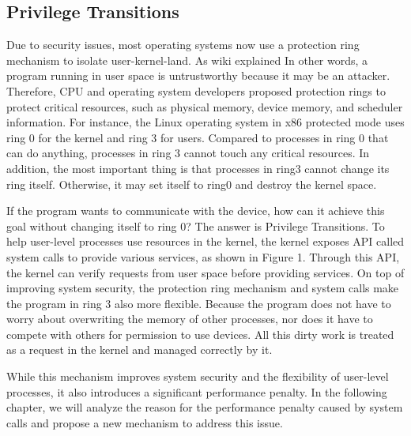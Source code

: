 \subsection{Privilege Transitions}
Due to security issues, most operating systems now use a protection ring 
mechanism to isolate user-kernel-land. As wiki explained 
In other words, a program running in user space is untrustworthy because it may be 
an attacker. Therefore, CPU and operating system developers proposed protection rings 
to protect critical resources, such as physical memory, device memory, and scheduler information. 
For instance, the Linux operating system in x86 protected mode uses ring 0 for the kernel and ring 3 
for users. Compared to processes in ring 0 that can do anything, processes in ring 3 cannot touch any critical 
resources. In addition, the most important thing is that processes in ring3 cannot change its ring itself. 
Otherwise, it may set itself to ring0 and destroy the kernel space.

If the program wants to communicate with the device, how can it achieve this goal without changing 
itself to ring 0? The answer is Privilege Transitions. To help user-level processes use resources 
in the kernel, the kernel exposes API called system calls to provide various services, as shown in Figure 1. 
Through this API, the kernel can verify requests from user space before providing services. On top of 
improving system security, the protection ring mechanism and system calls make the program in ring 3 
also more flexible. Because the program does not have to worry about overwriting the memory of other 
processes, nor does it have to compete with others for permission to use devices. All this dirty work 
is treated as a request in the kernel and managed correctly by it.

While this mechanism improves system security and the flexibility of user-level processes, 
it also introduces a significant performance penalty. In the following chapter, we will 
analyze the reason for the performance penalty caused by system calls and propose a new 
mechanism to address this issue. 

